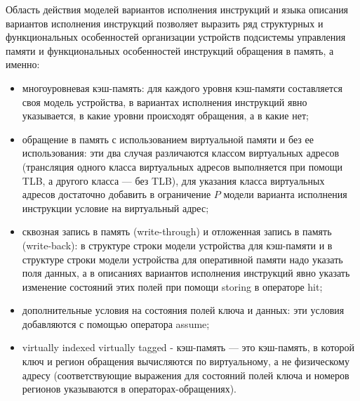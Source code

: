 Область действия моделей вариантов исполнения инструкций и языка описания вариантов исполнения инструкций позволяет выразить ряд структурных и функциональных особенностей организации устройств подсистемы управления памяти  и функциональных особенностей инструкций обращения в память, а именно:
\begin{itemize}
    \item многоуровневая кэш-память: для каждого уровня кэш-памяти составляется своя модель устройства, в вариантах исполнения инструкций явно указывается, в какие уровни происходят обращения, а в какие нет;
    \item обращение в память с использованием виртуальной памяти и без ее использования: эти два случая различаются классом виртуальных адресов (трансляция одного класса виртуальных адресов выполняется при помощи TLB, а другого класса --- без TLB), для указания класса виртуальных адресов достаточно добавить в ограничение $P$ модели варианта исполнения инструкции условие на виртуальный адрес;
    \item сквозная запись в память (write-through) и отложенная запись в память (write-back): в структуре строки модели устройства для кэш-памяти и в структуре строки модели устройства для оперативной памяти надо указать поля данных, а в описаниях вариантов исполнения инструкций явно указать изменение состояний этих полей при помощи storing в операторе hit;
    \item дополнительные условия на состояния полей ключа и данных: эти условия добавляются с помощью оператора assume;
    \item virtually indexed virtually tagged - кэш-память --- это кэш-память, в которой ключ и регион обращения вычисляются по виртуальному, а не физическому адресу (соответствующие выражения для состояний полей ключа и номеров регионов указываются в операторах-обращениях).
\end{itemize}

